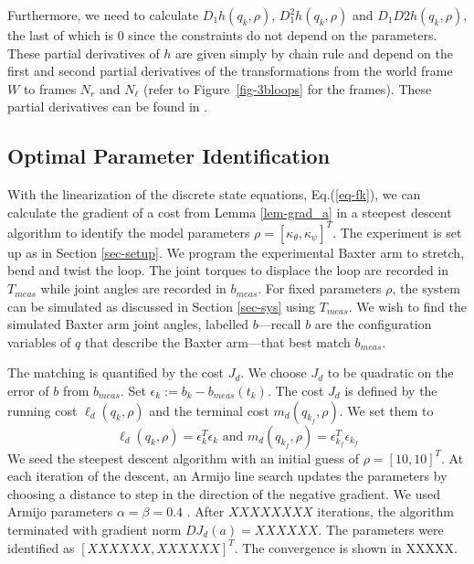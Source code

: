\documentclass[letterpaper, 10pt, conference]{ieeeconf}
\begin{document}
Furthermore, we need to calculate $D_1h(q_k,\rho)$, $D_1^2h(q_k,\rho)$ and $D_1D2h(q_k,\rho)$, the last of which is $0$ since the constraints do not depend on the parameters.  These partial derivatives of $h$ are given simply by chain rule and depend on the first and second partial derivatives of the transformations from the world frame $W$ to frames $N_r$ and $N_\ell$ (refer to Figure~\ref{fig-3bloops} for the frames).  These partial derivatives can be found in \cite{johnson_murphey_linearization}.  

\subsection{Optimal Parameter Identification}

With the linearization of the discrete state equations, Eq.(\ref{eq-fk}), we can calculate the gradient of a cost from Lemma \ref{lem-grad_a} in a steepest descent algorithm to identify the model parameters $\rho = [\kappa_\theta,\kappa_\psi]^T$.  The experiment is set up as in Section \ref{sec-setup}.  We program the experimental Baxter arm to stretch, bend and twist the loop.  The joint torques to displace the loop are recorded in $T_{meas}$ while joint angles are recorded in $b_{meas}$.    For fixed parameters $\rho$, the system can be simulated as discussed in Section \ref{sec-sys} using $T_{meas}$.  We wish to find the simulated Baxter arm joint angles, labelled $b$---recall $b$ are the configuration variables of $q$ that describe the Baxter arm---that best match $b_{meas}$.

The matching is quantified by the cost $J_d$.  We choose $J_d$ to be quadratic on the error of $b$ from $b_{meas}$.   Set $\epsilon_k := b_k-b_{meas}(t_k)$.  The cost $J_d$ is defined by the running cost $\ell_d(q_k,\rho)$ and the terminal cost $m_d(q_{k_f},\rho)$.  We set them to
\[
\ell_d(q_k,\rho) = \epsilon_k^T\epsilon_k \textrm{ and } m_d(q_{k_f},\rho) = \epsilon_{k_f}^T\epsilon_{k_f}
\]
We seed the steepest descent algorithm with an initial guess of $\rho = [10, 10]^T$.  At each iteration of the descent, an Armijo line search updates the parameters by choosing a distance to step in the direction of the negative gradient.  We used Armijo parameters $\alpha = \beta = 0.4$ \cite{armijo}.  After $XXXXXXXX$ iterations, the algorithm terminated with gradient norm $DJ_d(a) = XXXXXX$.  The parameters were identified as $[XXXXXX,XXXXXX]^T$.  The convergence is shown in XXXXX.%
\end{document}
